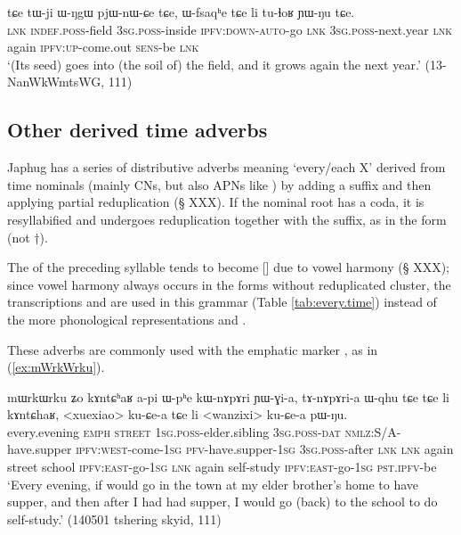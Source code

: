 \begin{exe}
\ex \label{ex:Wfsqaqhe}
\gll   tɕe tɯ-ji ɯ-ŋgɯ pjɯ-nɯ-ɕe tɕe, ɯ-fsaqʰe tɕe li tu-ɬoʁ ɲɯ-ŋu tɕe.   \\
 \textsc{lnk} \textsc{indef}.\textsc{poss}-field \textsc{3sg}.\textsc{poss}-inside \textsc{ipfv}:\textsc{down}-\textsc{auto}-go  \textsc{lnk} \textsc{3sg}.\textsc{poss}-next.year \textsc{lnk} again \textsc{ipfv}:\textsc{up}-come.out \textsc{sens}-be \textsc{lnk}  \\
\glt `(Its seed) goes into (the soil of) the field, and it grows again the next year.' (13-NanWkWmtsWG, 111)
\end{exe}

 \subsection{Other derived time adverbs} \label{sec:time.adv}
Japhug has a series of distributive adverbs meaning `every/each X' derived from time nominals (mainly CNs, but also APNs like ) by adding a suffix  and then applying partial reduplication (§ XXX). If the nominal root has a coda, it is resyllabified and undergoes reduplication together with the suffix, as in the form  (not $\dagger$). 

The  of the preceding syllable tends to become [] due to vowel harmony (§ XXX); since vowel harmony always occurs in the forms without reduplicated cluster, the transcriptions   and    are used in this grammar (Table \ref{tab:every.time}) instead of the more phonological representations  and .

These adverbs are commonly used with the emphatic marker , as in (\ref{ex:mWrkWrku}).


\begin{exe}
\ex \label{ex:mWrkWrku}
\gll  mɯrkɯrku ʑo kɤntɕʰaʁ a-pi ɯ-pʰe kɯ-nɤpɤri ɲɯ-ɣi-a, tɤ-nɤpɤri-a ɯ-qhu tɕe tɕe li kɤntɕhaʁ, <xuexiao> ku-ɕe-a tɕe li <wanzixi> ku-ɕe-a pɯ-ŋu. \\
every.evening \textsc{emph} \textsc{street} \textsc{1sg}.\textsc{poss}-elder.sibling \textsc{3sg}.\textsc{poss}-\textsc{dat} \textsc{nmlz}:S/A-have.supper \textsc{ipfv}:\textsc{west}-come-\textsc{1sg} \textsc{pfv}-have.supper-\textsc{1sg} \textsc{3sg}.\textsc{poss}-after \textsc{lnk} \textsc{lnk} again street school \textsc{ipfv}:\textsc{east}-go-\textsc{1sg} \textsc{lnk} again self-study \textsc{ipfv}:\textsc{east}-go-\textsc{1sg} \textsc{pst}.\textsc{ipfv}-be \\
\glt `Every evening, if would go in the town at my elder brother's home to have supper, and then after I had had supper, I would go (back) to the school to do self-study.' (140501 tshering skyid, 111)
\end{exe}

